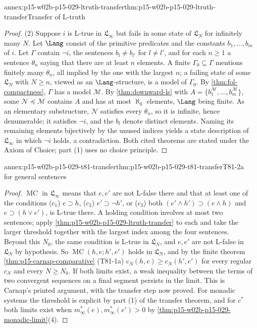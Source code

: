 \begin{annexitem}{annex:p15-w02b-p15-029-ltruth-transfer}{thm:p15-w02b-p15-029-ltruth-transfer}{Transfer of L-truth}
\begin{proof}
(2) Suppose \(i\) is L-true in \(\mathfrak L_\infty\) but fails in some
state of \(\mathfrak L_N\) for infinitely many \(N\). Let
\(\Lang\) consist of the primitive predicates and the constants
\(b_1,\ldots,b_m\) of \(i\). Let \(\Gamma\) contain \(\neg i\), the
sentences \(b_l\ne b_{l'}\) for \(l\ne l'\), and for each
\(n\geq1\) a sentence \(\theta_n\) saying that there are at least
\(n\) elements. A finite \(\Gamma_0\subseteq\Gamma\) mentions
finitely many \(\theta_n\), all implied by the one with the largest
\(n\); a failing state of some \(\mathfrak L_N\) with \(N\geq n\),
viewed as an \(\Lang\)-structure, is a model of \(\Gamma_0\). By
\cref{thm:fol-compactness}, \(\Gamma\) has a model
\(\mathcal M\). By \cref{thm:downward-ls} with
\(A=\{b_1^{\mathcal M},\ldots,b_m^{\mathcal M}\}\), some
\(\mathcal N\preccurlyeq\mathcal M\) contains \(A\) and has at most
\(\aleph_0\) elements, \(\Lang\) being finite. As an elementary
substructure, \(\mathcal N\) satisfies every \(\theta_n\), so it is
infinite, hence denumerable; it satisfies \(\neg i\), and the
\(b_l\) denote distinct elements. Naming its remaining elements
bijectively by the unused indices yields a state description of
\(\mathfrak L_\infty\) in which \(\neg i\) holds, a contradiction.
Both cited theorems are stated under the Axiom of Choice; part (1)
uses no choice principle.
\end{proof}
\end{annexitem}

\begin{annexitem}{annex:p15-w02b-p15-029-t81-transfer}{thm:p15-w02b-p15-029-t81-transfer}{T81-2a for general sentences}
\begin{proof}
\(\operatorname{MC}\) in \(\mathfrak L_\infty\) means that \(e,e'\)
are not L-false there and that at least one of the conditions
(\(c_1\)) \(e\supset h\), (\(c_2\)) \(e'\supset\neg h'\), or
(\(c_3\)) both \((e'\land h')\supset(e\land h)\) and
\(e\supset(h\lor e')\), is L-true there. A holding condition involves
at most two sentences; apply
\cref{thm:p15-w02b-p15-029-ltruth-transfer} to each and take the
larger threshold together with the largest index among the four
sentences. Beyond this \(N_0\), the same condition is L-true in
\(\mathfrak L_N\), and \(e,e'\) are not L-false in \(\mathfrak L_N\)
by hypothesis. So \(\operatorname{MC}(h,e;h',e')\) holds in
\(\mathfrak L_N\), and by the finite theorem
\cref{thm:p15-carnap-comparative} (T81-1a)
\(c_N(h,e)\geq c_N(h',e')\) for every regular \(c_N\) and every
\(N\geq N_0\). If both limits exist, a weak inequality between the
terms of two convergent sequences on a final segment persists in the
limit. This is Carnap's printed argument, with the transfer step now
proved. For monadic systems the threshold is explicit by part (1) of
the transfer theorem, and for \(c^*\) both limits exist when
\(m^*_\infty(e),m^*_\infty(e')>0\) by
\cref{thm:p15-w02b-p15-029-monadic-limit}(4).
\end{proof}
\end{annexitem}

